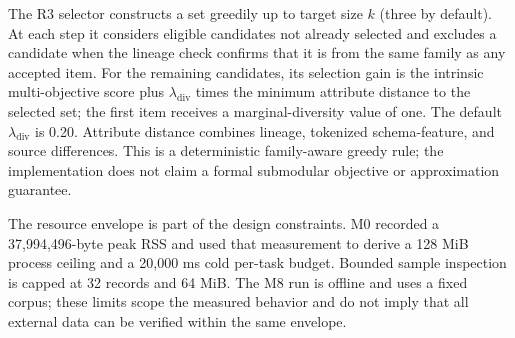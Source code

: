 \documentclass[conference]{IEEEtran}
\begin{document}
The R3 selector constructs a set greedily up to target size $k$ (three by default). At each step it considers eligible candidates not already selected and excludes a candidate when the lineage check confirms that it is from the same family as any accepted item. For the remaining candidates, its selection gain is the intrinsic multi-objective score plus $\lambda_{\mathrm{div}}$ times the minimum attribute distance to the selected set; the first item receives a marginal-diversity value of one. The default $\lambda_{\mathrm{div}}$ is 0.20. Attribute distance combines lineage, tokenized schema-feature, and source differences. This is a deterministic family-aware greedy rule; the implementation does not claim a formal submodular objective or approximation guarantee.

The resource envelope is part of the design constraints. M0 recorded a 37,994,496-byte peak RSS and used that measurement to derive a 128 MiB process ceiling and a 20,000 ms cold per-task budget. Bounded sample inspection is capped at 32 records and 64 MiB. The M8 run is offline and uses a fixed corpus; these limits scope the measured behavior and do not imply that all external data can be verified within the same envelope.
\end{document}
